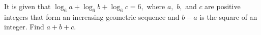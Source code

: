 It is given that $\log_{6}a+\log_{6}b+\log_{6}c=6,$ where $a,$ $b,$ and $c$ are positive integers that form an increasing geometric sequence and $b-a$ is the square of an integer. Find $a+b+c.$